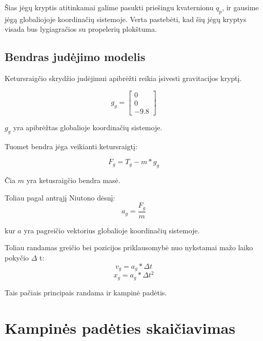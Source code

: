 \documentclass[12pt, a4paper, lithuanian, final]{article}
\begin{document}
Šias jėgų kryptis atitinkamai galime pasukti priešingu kvaternionu $q_{p}$, ir gausime jėgą globaliojoje koordinačių sistemoje.
Verta pastebėti, kad šių jėgų kryptys visada bus lygiagračios su propelerių plokštuma.

\subsection{Bendras judėjimo modelis}

Ketursraigčio skrydžio judėjimui apibrėžti reikia įsivesti gravitacijos kryptį.

\begin{equation}
	g_{g} =  \left[
		\begin{array}{c}
			0 \\
			0 \\
			-9.8
		\end{array}
	\right]
\end{equation}

$g_{g}$ yra apibrėžtas globalioje koordinačių sistemoje.

Tuomet bendra jėga veikianti ketursraigtį:

\begin{equation}
	F_{g} = T_{g} - m*g_{g}
\end{equation}

Čia $m$  yra ketusraigčio bendra masė.

Toliau pagal antrąjį Niutono dėsnį:
\begin{equation}
	a_{g} = \dfrac{F_{g}}{m}
\end{equation}

kur $a$ yra pagreičio vektorius globalioje koordinačių sistemoje.

Toliau randamas greičio bei pozicijos priklausomybė nuo nykstamai mažo laiko pokyčio $\Delta$ t:
\begin{equation}
	v_{g} = a_{g} * \Delta t
\end{equation}
\begin{equation}
	x_{g} = a_{g} * \Delta t ^2
\end{equation}

Tais pačiais principais randama ir kampinė padėtis.







\section{Kampinės padėties skaičiavimas}
\label{skyr-attitude}
\end{document}
